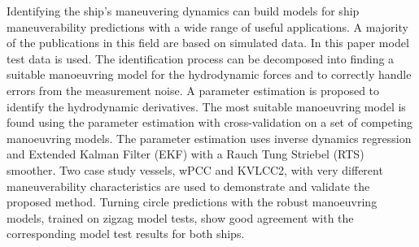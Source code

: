 Identifying the ship's maneuvering dynamics can build models for ship maneuverability predictions with a wide range of useful applications. 
A majority of the publications in this field are based on simulated data. In this paper model test data is used. The identification process can be decomposed into finding a suitable manoeuvring model  for the hydrodynamic forces and to correctly handle errors from the measurement noise. A parameter estimation is proposed to identify the hydrodynamic derivatives. The most suitable manoeuvring model is found using the parameter estimation with cross-validation on a set of competing manoeuvring models. The parameter estimation uses inverse dynamics regression and Extended Kalman Filter (EKF) with a Rauch Tung Striebel (RTS) smoother. Two case study vessels, wPCC and KVLCC2, with very different maneuverability characteristics are used to demonstrate and validate the proposed method. Turning circle predictions with the robust manoeuvring models, trained on zigzag model tests, show good agreement with the corresponding model test results for both ships.

